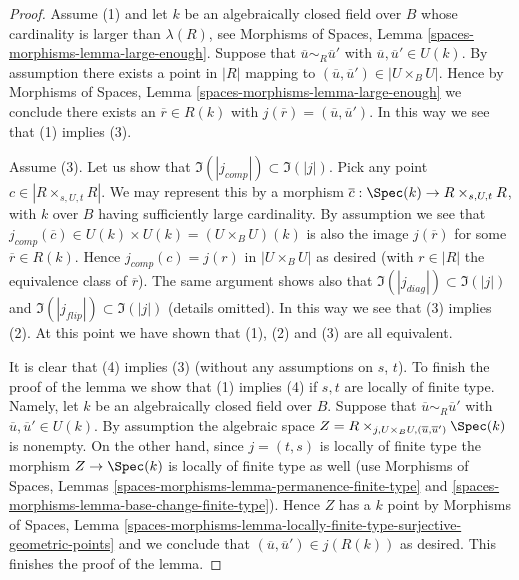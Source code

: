 \begin{proof}
\medskip\noindent
Assume (1) and let $k$ be an algebraically closed field over $B$ whose
cardinality is larger than $\lambda(R)$, see
Morphisms of Spaces, Lemma \ref{spaces-morphisms-lemma-large-enough}.
Suppose that $\overline{u} \sim_R \overline{u}'$ with
$\overline{u}, \overline{u}' \in U(k)$. By assumption there exists
a point in $|R|$ mapping to $(\overline{u}, \overline{u}') \in |U \times_B U|$.
Hence by
Morphisms of Spaces, Lemma \ref{spaces-morphisms-lemma-large-enough}
we conclude there exists an $\overline{r} \in R(k)$ with
$j(\overline{r}) = (\overline{u}, \overline{u}')$. In this way we see
that (1) implies (3).

\medskip\noindent
Assume (3). Let us show that
$\Im(|j_{comp}|) \subset \Im(|j|)$. Pick any point
$c \in |R \times_{s, U, t} R|$. We may represent this by a morphism
$\overline{c} : \Spec(k) \to R \times_{s, U, t} R$, with $k$ over $B$
having sufficiently large cardinality. By assumption we see that
$j_{comp}(\overline{c}) \in U(k) \times U(k) = (U \times_B U)(k)$
is also the image $j(\overline{r})$ for some $\overline{r} \in R(k)$.
Hence $j_{comp}(c) = j(r)$ in $|U \times_B U|$ as desired (with
$r \in |R|$ the equivalence class of $\overline{r}$). The same argument
shows also that $\Im(|j_{diag}|) \subset \Im(|j|)$ and
$\Im(|j_{flip}|) \subset \Im(|j|)$ (details omitted).
In this way we see that (3) implies (2). At this point we have
shown that (1), (2) and (3) are all equivalent.

\medskip\noindent
It is clear that (4) implies (3) (without any assumptions on $s$, $t$).
To finish the proof of the lemma we show that (1) implies (4) if $s, t$
are locally of finite type. Namely, let $k$ be an algebraically closed
field over $B$. Suppose that $\overline{u} \sim_R \overline{u}'$ with
$\overline{u}, \overline{u}' \in U(k)$. By assumption the algebraic space
$Z = R \times_{j, U \times_B U, (\overline{u}, \overline{u}')} \Spec(k)$
is nonempty. On the other hand, since $j = (t, s)$ is locally of finite type
the morphism $Z \to \Spec(k)$ is locally of finite type as well (use
Morphisms of Spaces, Lemmas \ref{spaces-morphisms-lemma-permanence-finite-type}
and \ref{spaces-morphisms-lemma-base-change-finite-type}).
Hence $Z$ has a $k$ point by
Morphisms of Spaces, Lemma
\ref{spaces-morphisms-lemma-locally-finite-type-surjective-geometric-points}
and we conclude that $(\overline{u}, \overline{u}') \in j(R(k))$
as desired. This finishes the proof of the lemma.
\end{proof}

